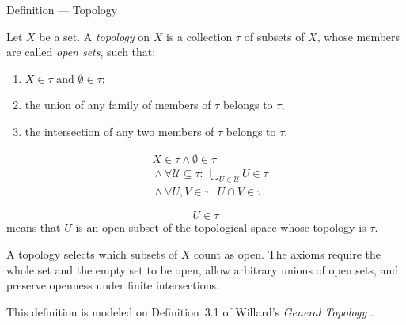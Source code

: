 \begin{definitionbox}{Definition --- Topology}
\begin{definition}[Topology]\label{def:topology-on-set}
Let \(X\) be a set.  A \emph{topology} on \(X\) is a collection \(\tau\) of
subsets of \(X\), whose members are called \emph{open sets}, such that:
\begin{enumerate}
  \item \(X\in\tau\) and \(\emptyset\in\tau\);
  \item the union of any family of members of \(\tau\) belongs to \(\tau\);
  \item the intersection of any two members of \(\tau\) belongs to \(\tau\).
\end{enumerate}
\end{definition}
\end{definitionbox}

\begin{remark*}
\[
\begin{aligned}
&X\in\tau
\land
\emptyset\in\tau
\\
&{}\land
\forall \mathcal{U}\subseteq\tau{:}\;
\bigcup_{U\in\mathcal{U}}U\in\tau
\\
&{}\land
\forall U,V\in\tau{:}\;
U\cap V\in\tau.
\end{aligned}
\]
\end{remark*}

\begin{remark*}
\[
U\in\tau
\]
means that \(U\) is an open subset of the topological space whose topology is
\(\tau\).
\end{remark*}

\begin{remark*}[Interpretation]
A topology selects which subsets of \(X\) count as open.  The axioms require
the whole set and the empty set to be open, allow arbitrary unions of open
sets, and preserve openness under finite intersections.
\end{remark*}

\begin{remark*}
This definition is modeled on Definition~3.1 of Willard's
\emph{General Topology} \cite{WillardGeneralTopology}.
\end{remark*}


\DefinitionalRoot

